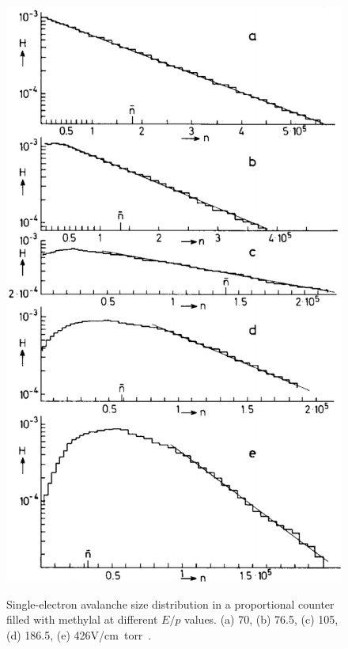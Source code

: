 	\begin{figure}[H]
		\centering
		\includegraphics[width = 0.6\plotwidth]{fig/chapt4/Genz1973.png}\\
		\caption{\label{fig:genz} Single-electron avalanche size distribution in a proportional counter filled with methylal at different $E/p$ values. (a) 70, (b) 76.5, (c) 105, (d) 186.5, (e) 426\si{V/cm.torr}~\cite{GENZ1973}.}
	\end{figure}
	
